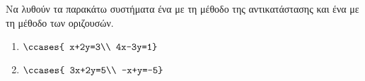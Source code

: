 Να λυθούν τα παρακάτω συστήματα ένα με τη μέθοδο της αντικατάστασης και ένα με τη μέθοδο των οριζουσών.
\begin{multicols}{2}
\begin{enumerate}[label=\roman*.,itemsep=0mm]
\item $\ccases{
x+2y=3\\
4x-3y=1}$
\item $\ccases{
3x+2y=5\\
-x+y=-5}$
\end{enumerate}\end{multicols}